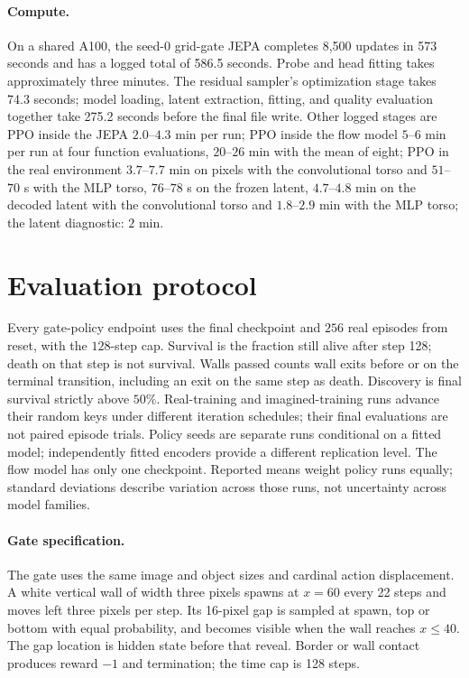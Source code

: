\paragraph{Compute.} On a shared A100, the seed-0 grid-gate JEPA completes 8,500 updates in
573 seconds and has a logged total of 586.5 seconds. Probe and head fitting takes approximately
three minutes. The residual sampler's optimization stage takes 74.3 seconds; model loading, latent
extraction, fitting, and quality evaluation together take 275.2 seconds before the final file write.
Other logged stages are PPO inside the JEPA $2.0$--$4.3$ min per run; PPO inside the flow model
$5$--$6$ min per run at four function evaluations, $20$--$26$ min with the mean of eight; PPO in the real environment $3.7$--$7.7$ min on pixels with the convolutional torso and $51$--$70$ s with the MLP torso, $76$--$78$ s on the frozen latent, $4.7$--$4.8$ min on the decoded latent with the convolutional torso and $1.8$--$2.9$ min with the MLP torso; the latent diagnostic: $2$ min.

\section{Evaluation protocol}
\label{app:protocol}

Every gate-policy endpoint uses the final checkpoint and $256$ real episodes from reset, with the
$128$-step cap. Survival is the fraction still alive after step 128; death on that step is not
survival. Walls passed counts wall exits before or on the terminal transition, including an exit
on the same step as death. Discovery is final survival strictly above $50\%$.
Real-training and imagined-training runs advance their random keys under different iteration schedules; their final evaluations are not paired episode trials. Policy seeds are separate
runs conditional on a fitted model; independently fitted encoders provide a different replication
level. The flow model has only one checkpoint. Reported means weight policy runs equally;
standard deviations describe variation across those runs, not uncertainty across model families.

\paragraph{Gate specification.}
The gate uses the same image and object sizes and cardinal action displacement. A white vertical
wall of width three pixels spawns at $x=60$ every 22 steps and moves left three pixels per step.
Its 16-pixel gap is sampled at spawn, top or bottom with equal probability, and becomes visible
when the wall reaches $x\le40$. The gap location is hidden state before that reveal. Border or wall
contact produces reward $-1$ and termination; the time cap is 128 steps.

